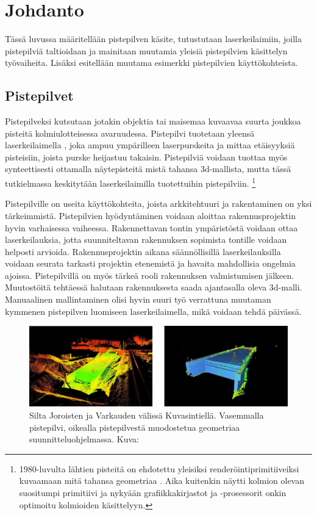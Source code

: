 \section{Johdanto}
Tässä luvussa määritellään pistepilven käsite, tutustutaan laserkeilaimiin, joilla pistepilviä taltioidaan ja mainitaan muutamia yleisiä pistepilvien käsittelyn työvaiheita. Lisäksi esitellään muutama esimerkki pistepilvien käyttökohteista. 

\subsection{Pistepilvet}

Pistepilveksi kutsutaan jotakin objektia tai maisemaa kuvaavaa suurta joukkoa pisteitä kolmiulotteisessa avaruudessa. Pistepilvi tuotetaan yleensä laserkeilaimella , joka ampuu ympärilleen laserpurskeita ja mittaa etäisyyksiä pisteisiin, joista purske heijastuu takaisin. Pistepilviä voidaan tuottaa myös synteettisesti ottamalla näytepisteitä mistä tahansa 3d-mallista, mutta tässä tutkielmassa keskitytään laserkeilaimilla tuotettuihin pistepilviin. \footnote{1980-luvulta lähtien pisteitä on ehdotettu yleisiksi renderöintiprimitiiveiksi kuvaamaan mitä tahansa geometriaa \cite{Whitted}. Aika kuitenkin näytti kolmion olevan suositumpi primitiivi ja nykyään grafiikkakirjastot ja -prosessorit onkin optimoitu kolmioiden käsittelyyn.}

Pistepilville on useita käyttökohteita, joista arkkitehtuuri ja rakentaminen on yksi tärkeimmistä. Pistepilvien hyödyntäminen voidaan aloittaa rakennusprojektin hyvin varhaisessa vaiheessa. Rakennettavan tontin ympäristöstä voidaan ottaa laserkeilauksia, jotta suunniteltavan rakennuksen sopimista tontille voidaan helposti arvioida. Rakennusprojektin aikana säännöllisillä laserkeilauksilla voidaan seurata tarkasti projektin etenemistä ja havaita mahdollisia ongelmia ajoissa. Pistepilvillä on myös tärkeä rooli rakennuksen valmistumisen jälkeen. Muutostöitä tehtäessä halutaan rakennuksesta saada ajantasalla oleva 3d-malli. Manuaalinen mallintaminen olisi hyvin suuri työ verrattuna muutaman kymmenen pistepilven luomiseen laserkeilaimella, mikä voidaan tehdä päivässä. \cite{bim} 

\begin{figure}
    \centering
    \includegraphics[width=\textwidth]{img/silta.png}
    \caption{Silta Joroisten ja Varkauden välissä Kuvasintiellä. Vasemmalla pistepilvi, oikealla pistepilvestä muodostetua geometriaa suunnitteluohjelmassa. Kuva: \cite{silta}}
    \label{silt}
\end{figure}

